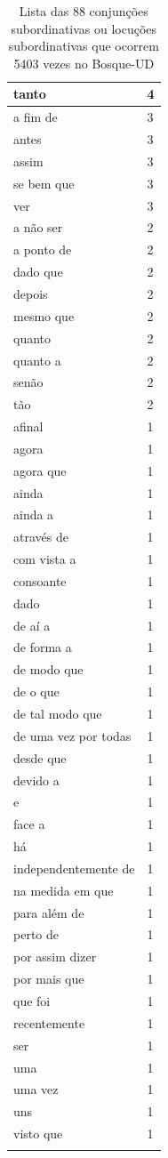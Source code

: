 \documentclass[output=paper,colorlinks,citecolor=brown]{langscibook}
\begin{document}
\begin{longtable}{ | p{3cm} | p{2cm} | }
		tanto & 4\\\hline
		a fim de & 3\\\hline
		antes & 3\\\hline
		assim & 3\\\hline
		se bem que & 3\\\hline
		ver & 3\\\hline
		a não ser & 2\\\hline
		a ponto de & 2\\\hline
		dado que & 2\\\hline
		depois & 2\\\hline
		mesmo que & 2\\\hline
		quanto & 2\\\hline
		quanto a & 2\\\hline
		senão & 2\\\hline
		tão & 2\\\hline
		afinal & 1\\\hline
		agora & 1\\\hline
		agora que & 1\\\hline
		ainda & 1\\\hline
		ainda a & 1\\\hline
		através de & 1\\\hline
		com vista a & 1\\\hline
		consoante & 1\\\hline
		dado & 1\\\hline
		de aí a & 1\\\hline
		de forma a & 1\\\hline
		de modo que & 1\\\hline
		de o que & 1\\\hline
		de tal modo que & 1\\\hline
		de uma vez por todas & 1\\\hline
		desde que & 1\\\hline
		devido a & 1\\\hline
		e & 1\\\hline
		face a & 1\\\hline
		há & 1\\\hline
		independentemente de & 1\\\hline
		na medida em que & 1\\\hline
		para além de & 1\\\hline
		perto de & 1\\\hline
		por assim dizer & 1\\\hline
		por mais que & 1\\\hline
		que foi & 1\\\hline
		recentemente & 1\\\hline
		ser & 1\\\hline
		uma & 1\\\hline
		uma vez & 1\\\hline
		uns & 1\\\hline
		visto que & 1\\\hline
		\caption{Lista das 88 conjunções subordinativas ou locuções subordinativas que ocorrem 5403 vezes no Bosque-UD}
		\label{tab:sconj}
	\end{longtable}
\end{document}
